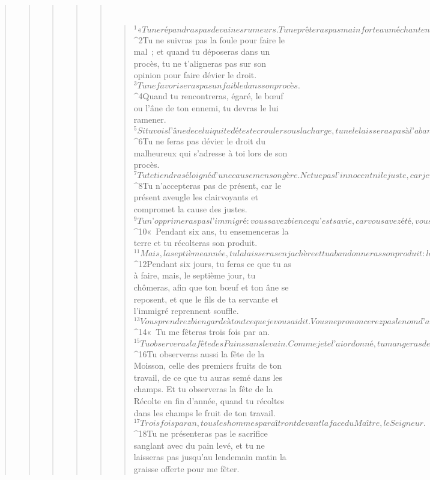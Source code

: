 \begin{verse}
\begin{verse}
\begin{verse}
\begin{verse}
\begin{verse}
         
      \bchapter{}
      \begin{verse}
${}^{1}« Tu ne répandras pas de vaines rumeurs. Tu ne prêteras pas main forte au méchant en lui servant de témoin à charge.
${}^{2}Tu ne suivras pas la foule pour faire le mal ; et quand tu déposeras dans un procès, tu ne t’aligneras pas sur son opinion pour faire dévier le droit. 
${}^{3}Tu ne favoriseras pas un faible dans son procès. 
${}^{4}Quand tu rencontreras, égaré, le bœuf ou l’âne de ton ennemi, tu devras le lui ramener. 
${}^{5}Si tu vois l’âne de celui qui te déteste crouler sous la charge, tu ne le laisseras pas à l’abandon mais tu lui viendras en aide. 
${}^{6}Tu ne feras pas dévier le droit du malheureux qui s’adresse à toi lors de son procès. 
${}^{7}Tu te tiendras éloigné d’une cause mensongère. Ne tue pas l’innocent ni le juste, car je ne justifie pas le méchant. 
${}^{8}Tu n’accepteras pas de présent, car le présent aveugle les clairvoyants et compromet la cause des justes. 
${}^{9}Tu n’opprimeras pas l’immigré : vous savez bien ce qu’est sa vie, car vous avez été, vous aussi, des immigrés au pays d’Égypte.
${}^{10}« Pendant six ans, tu ensemenceras la terre et tu récolteras son produit. 
${}^{11}Mais, la septième année, tu la laisseras en jachère et tu abandonneras son produit : les malheureux de ton peuple le mangeront et, ce qu’ils auront laissé, les bêtes sauvages le mangeront. Tu feras de même pour ta vigne et ton olivier.
${}^{12}Pendant six jours, tu feras ce que tu as à faire, mais, le septième jour, tu chômeras, afin que ton bœuf et ton âne se reposent, et que le fils de ta servante et l’immigré reprennent souffle.
${}^{13}Vous prendrez bien garde à tout ce que je vous ai dit. Vous ne prononcerez pas le nom d’autres dieux : on ne l’entendra pas sortir de ta bouche.
${}^{14}« Tu me fêteras trois fois par an. 
${}^{15}Tu observeras la fête des Pains sans levain. Comme je te l’ai ordonné, tu mangeras des pains sans levain pendant sept jours, au temps fixé du mois des Épis, car c’est alors que tu es sorti d’Égypte. On ne paraîtra pas devant ma face les mains vides. 
${}^{16}Tu observeras aussi la fête de la Moisson, celle des premiers fruits de ton travail, de ce que tu auras semé dans les champs. Et tu observeras la fête de la Récolte en fin d’année, quand tu récoltes dans les champs le fruit de ton travail. 
${}^{17}Trois fois par an, tous les hommes paraîtront devant la face du Maître, le Seigneur. 
${}^{18}Tu ne présenteras pas le sacrifice sanglant avec du pain levé, et tu ne laisseras pas jusqu’au lendemain matin la graisse offerte pour me fêter. 

\end{verse}
\end{verse}
\end{verse}
\end{verse}
\end{verse}
\end{verse}
